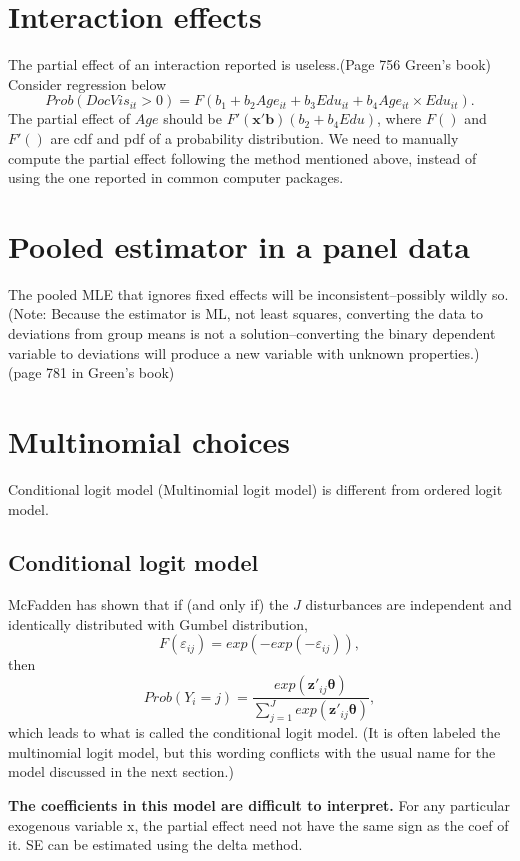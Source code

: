 \documentclass[10pt]{article}
\begin{document}
\section{Interaction effects}
The partial effect of an interaction reported is useless.(Page 756 Green's book)
Consider regression below
\begin{equation*}
Prob(DocVis_{it} > 0) = F(b_1 + b_2Age_{it} + b_3Edu_{it} + b_4Age_{it} \times Edu_{it}).
\end{equation*}
The partial effect of $ Age $ should be $ F'(\bm{x}'\bm{b})(b_2 + b_4Edu) $,
where $ F() $ and $ F'() $ are cdf and pdf of a probability distribution.
We need to manually compute the partial effect following the method mentioned above, 
instead of using the one reported in common computer packages.




\section{Pooled estimator in a panel data}

The pooled MLE that ignores fixed effects will be inconsistent--possibly wildly so.
(Note: Because the estimator is ML, not least squares, converting the data to deviations
from group means is not a solution--converting the binary dependent variable to deviations
will produce a new variable with unknown properties.)(page 781 in Green's book)







\section{Multinomial choices}

Conditional logit model (Multinomial logit model) is different from ordered logit model.

\subsection{Conditional logit model}
McFadden has shown that if (and only if) the $ J $ disturbances are independent and
identically distributed with Gumbel distribution,
\begin{equation*}
F(\varepsilon_{ij}) = exp( - exp( - \varepsilon_{ij})),
\end{equation*}
then
\begin{equation*}
Prob(Y_{i} = j) = \frac{exp(\bm{z'}_{ij} \bm{\theta})}{\sum\limits_{j = 1} ^J	
exp(\bm{z'}_{ij} \bm{\theta})},
\end{equation*}
which leads to what is called the conditional logit model. (It is often labeled the
multinomial logit model, but this wording conflicts with the usual name for the model
discussed in the next section.)

{\textbf {The coefficients in this model are difficult to interpret.}}
For any particular exogenous variable x, the partial effect need not have the same sign
as the coef of it. SE can be estimated using the delta method.





\end{document}
